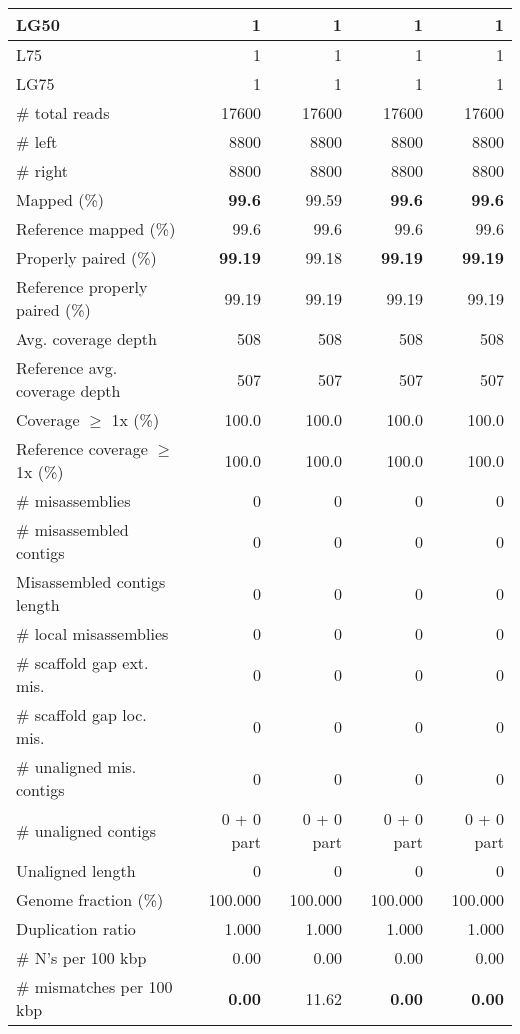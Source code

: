 \documentclass[12pt,a4paper]{article}
\begin{document}
\begin{table}[ht]
\begin{center}
\begin{tabular}{|l*{4}{|r}|}
LG50 & 1 & 1 & 1 & 1 \\ \hline
L75 & 1 & 1 & 1 & 1 \\ \hline
LG75 & 1 & 1 & 1 & 1 \\ \hline
\# total reads & 17600 & 17600 & 17600 & 17600 \\ \hline
\# left & 8800 & 8800 & 8800 & 8800 \\ \hline
\# right & 8800 & 8800 & 8800 & 8800 \\ \hline
Mapped (\%) & {\bf 99.6} & 99.59 & {\bf 99.6} & {\bf 99.6} \\ \hline
Reference mapped (\%) & 99.6 & 99.6 & 99.6 & 99.6 \\ \hline
Properly paired (\%) & {\bf 99.19} & 99.18 & {\bf 99.19} & {\bf 99.19} \\ \hline
Reference properly paired (\%) & 99.19 & 99.19 & 99.19 & 99.19 \\ \hline
Avg. coverage depth & 508 & 508 & 508 & 508 \\ \hline
Reference avg. coverage depth & 507 & 507 & 507 & 507 \\ \hline
Coverage $\geq$ 1x (\%) & 100.0 & 100.0 & 100.0 & 100.0 \\ \hline
Reference coverage $\geq$ 1x (\%) & 100.0 & 100.0 & 100.0 & 100.0 \\ \hline
\# misassemblies & 0 & 0 & 0 & 0 \\ \hline
\# misassembled contigs & 0 & 0 & 0 & 0 \\ \hline
Misassembled contigs length & 0 & 0 & 0 & 0 \\ \hline
\# local misassemblies & 0 & 0 & 0 & 0 \\ \hline
\# scaffold gap ext. mis. & 0 & 0 & 0 & 0 \\ \hline
\# scaffold gap loc. mis. & 0 & 0 & 0 & 0 \\ \hline
\# unaligned mis. contigs & 0 & 0 & 0 & 0 \\ \hline
\# unaligned contigs & 0 + 0 part & 0 + 0 part & 0 + 0 part & 0 + 0 part \\ \hline
Unaligned length & 0 & 0 & 0 & 0 \\ \hline
Genome fraction (\%) & 100.000 & 100.000 & 100.000 & 100.000 \\ \hline
Duplication ratio & 1.000 & 1.000 & 1.000 & 1.000 \\ \hline
\# N's per 100 kbp & 0.00 & 0.00 & 0.00 & 0.00 \\ \hline
\# mismatches per 100 kbp & {\bf 0.00} & 11.62 & {\bf 0.00} & {\bf 0.00} \\ \hline

\end{tabular}
\end{center}
\end{table}
\end{document}
